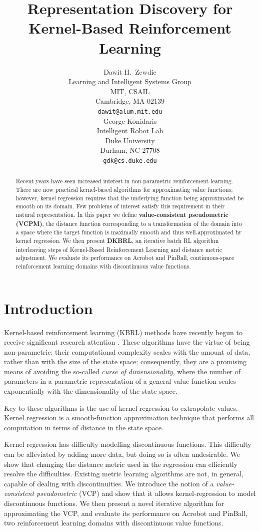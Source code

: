 \documentclass{article} %
\title{Representation Discovery for Kernel-Based
Reinforcement Learning}
\author{
Dawit H.~Zewdie \\
Learning and Intelligent Systems Group\\
MIT, CSAIL\\
Cambridge, MA 02139 \\
\texttt{dawit@alum.mit.edu} \\
\And
George Konidaris\\
Intelligent Robot Lab\\
Duke University\\
Durham, NC 27708\\
\texttt{gdk@cs.duke.edu} \\
}
\begin{document}
\maketitle

\begin{abstract}
Recent years have seen increased interest in non-parametric reinforcement
learning.
There are now practical kernel-based algorithms for approximating
value functions; however, kernel regression requires that the underlying
function being approximated be smooth on its domain.
Few problems of interest satisfy this requirement in their natural representation.
In this paper we define \textbf{value-consistent pseudometric (VCPM)}, the
distance function corresponding to a transformation of the domain into a space where
the target function is maximally smooth and thus well-approximated by kernel regression.
We then present \textbf{DKBRL}, an iterative batch RL algorithm interleaving steps of
Kernel-Based Reinforcement Learning and distance metric adjustment.
We evaluate its performance on Acrobot and PinBall,
continuous-space reinforcement learning domains with discontinuous value functions.
\end{abstract}

\section{Introduction}

Kernel-based reinforcement learning (KBRL) methods  have recently
begun to receive significant research
attention \cite{kbrl,kbrl2,kbsf,ikbsf,pkbrl}. These
algorithms have the virtue of being non-parametric: their computational complexity
scales with the amount of data, rather than with the size of the state space; consequently,
they are a promising means of avoiding the so-called \textit{curse of dimensionality}, where
the number of parameters in a parametric representation of a general value function
scales exponentially with the dimensionality of the state space. 

Key to these algorithms is the use of kernel regression to extrapolate values.
Kernel regression is a smooth-function approximation technique that performs
all computation in terms of distance in the state space.

Kernel regression has difficulty modelling discontinuous functions.
This difficulty can be alleviated by adding more data, but doing so is often undesirable.
We show that changing the distance metric used in the
regression can efficiently resolve the difficulties.
Existing metric learning algorithms are not, in general, capable of dealing with
discontinuities.
We introduce the notion of a \textit{value-consistent pseudometric} (VCP) and show
that it allows kernel-regression to model discontinuous functions.
We then present a novel iterative algorithm for approximating the VCP,
and evaluate its performance on Acrobot and PinBall,
two reinforcement learning domains with discontinuous value functions.
\end{document}
